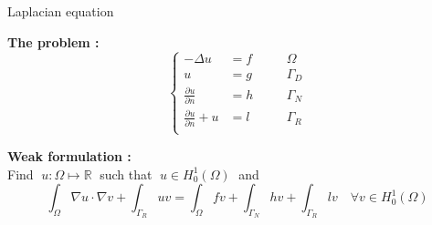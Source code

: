 \begin{frame}{Laplacian equation}
	
	\textbf{The problem :}
	$$\left\{\begin{aligned}
		-\Delta u &= f \quad&&\Omega \\
		u&=g \quad&&\Gamma_D \\
		\frac{\partial u}{\partial n} &=h \quad &&\Gamma_N \\
		\frac{\partial u}{\partial n}+u &=l \quad &&\Gamma_R \\
	\end{aligned}\right.$$
	
	\textbf{Weak formulation :} \\
	Find $\; u:\Omega \mapsto \mathbb{R} \;$ such that $\; u\in H_0^1(\Omega) \;$ and
	$$\int_\Omega \nabla u \cdot \nabla v + \int_{\Gamma_R}uv = \int_\Omega fv + \int_{\Gamma_N}hv+\int_{\Gamma_R}lv \quad \forall v\in H_0^1(\Omega)$$
	
\end{frame}

